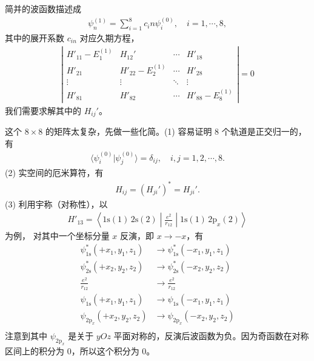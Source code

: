 简并的波函数描述成
\begin{align}
    \psi_n^{(1)} = \sum_{i=1}^8 c_in \psi_i^{(0)}, \quad i=1,\cdots,8,
\end{align}
其中的展开系数 $c_{in}$ 对应久期方程，
\begin{align}
    \left|\begin{matrix}
        H'_{11} - E_1^{(1)} & H_{12}' & \cdots & H'_{18} \\
        H'_{21} & H'_{22} - E_2^{(1)} & \cdots & H'_{28} \\
        \vdots & \vdots & \ddots & \vdots \\
        H'_{81} & H'_{82} & \cdots & H'_{88} - E_8^{(1)}
    \end{matrix}\right| = 0
\end{align}
我们需要求解其中的 $H_{ij}'$。

这个 $8\times8$ 的矩阵太复杂，先做一些化简。(1) 容易证明 8 个轨道是正交归一的，有
\begin{align}
    \langle \psi_i^{(0)} | \psi_j^{(0)} \rangle = \delta_{ij}, \quad i,j = 1, 2, \cdots, 8. 
\end{align}
(2) 实空间的厄米算符，有
\begin{align}
    H_{ij} = (H_{ji}')^* = H_{ji}'. 
\end{align}
(3) 利用宇称（对称性），以
\begin{align}
    H'_{13} = \left\langle \mathrm{1s(1) \, 2s(2)} \middle | \frac{e^2}{r_{12}} \middle| \mathrm{1s(1)\,2p}_x(2) \right\rangle
\end{align}
为例，
对其中一个坐标分量 $x$ 反演，即 $x\rightarrow -x$，有
\begin{align}
\psi_{\mathrm{1s}}^* (+x_1, y_1, z_1) &\rightarrow \psi_{\mathrm{1s}}^* (-x_1, y_1, z_1) \\
\psi_{\mathrm{2s}}^* (+x_2, y_2, z_2) &\rightarrow \psi_{\mathrm{2s}}^* (-x_2, y_2, z_2) \\
\frac{e^2}{r_{12}} &\rightarrow \frac{e^2}{r_{12}} \\
\psi_{\mathrm{1s}} (+x_1, y_1, z_1) &\rightarrow \psi_{\mathrm{1s}} (-x_1, y_1, z_1) \\
\psi_{\mathrm{2p}_x} (+x_2, y_2, z_2) &\rightarrow \psi_{\mathrm{2p}_x}(-x_2, y_2, z_2) \\ 
\end{align}
注意到其中 $\psi_{2\mathrm{p}_x}$ 是关于 $yOz$ 平面对称的，反演后波函数为负。因为奇函数在对称区间上的积分为 0，所以这个积分为 0。


